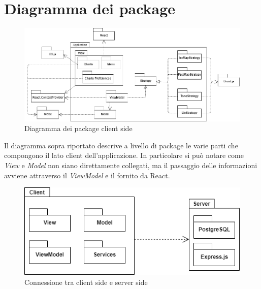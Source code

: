 \section{Diagramma dei package}
\begin{figure}[hb]
\includegraphics[width=15.8cm]{Images/Allegato Tecnico-Package}
\centering
\caption{Diagramma dei package client side}
\end{figure}

Il diagramma sopra riportato descrive a livello di package le varie parti che compongono il lato client dell'applicazione. In particolare si può notare come \textit{View} e \textit{Model} non siano direttamente collegati, ma il passaggio delle informazioni avviene attraverso il \textit{ViewModel} e il  fornito da React. %

\begin{figure}[hb]
\includegraphics[width=15.8cm]{Images/Allegato Tecnico-Package 2}
\centering
\caption{Connessione tra client side e server side}
\end{figure}